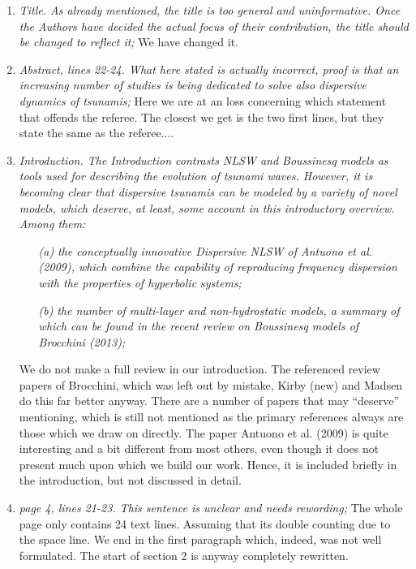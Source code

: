 \documentclass[11pt]{article}
\begin{document}
\begin{enumerate}
\item{\em Title. As already mentioned, the title is too general and uninformative. Once the
Authors have decided the actual focus of their contribution, the title should be
changed to reflect it;}
We have changed it. 
\item{\em Abstract, lines 22-24. What here stated is actually incorrect, proof is that an
increasing number of studies is being dedicated to solve also dispersive dynamics of
tsunamis;}
Here we are at an loss concerning which statement that offends the referee. The closest we 
get is the two first lines, but they state the same as the referee....
\item {\em Introduction. The Introduction contrasts NLSW and Boussinesq models as tools
used for describing the evolution of tsunami waves. However, it is becoming clear
that dispersive tsunamis can be modeled by a variety of novel models, which deserve,
at least, some account in this introductory overview.\\
Among them:}
\begin{itemize}
\item[{\em (a)}] {\em the conceptually innovative Dispersive NLSW of Antuono et al. (2009), which
combine the capability of reproducing frequency dispersion with the properties
of hyperbolic systems;}
\item[{\em (b)}] {\em the number of multi-layer and non-hydrostatic models, a summary of which
can be found in the recent review on Boussinesq models of Brocchini (2013);}
\end{itemize}
We do not make a full review in our introduction. The referenced review papers of Brocchini, which was left out 
by mistake, Kirby (new) and Madsen do this far better anyway.
There are a number of papers that may ``deserve'' mentioning, which is still not mentioned as the primary references
always are those which we draw on directly.  The paper Antuono et al. (2009) is quite interesting and
a bit different from most others, even though it does not present much upon which we build our work. Hence, it is included briefly in the introduction, but not discussed in detail.    
\item{\em page 4, lines 21-23. This sentence is unclear and needs rewording;}
The whole page only contains 24 text lines. Assuming that its double counting due to
the space line. We end in the first paragraph which, indeed, was not well formulated. 
The start of section 2 is anyway completely rewritten.  

\end{enumerate}
\end{document}
